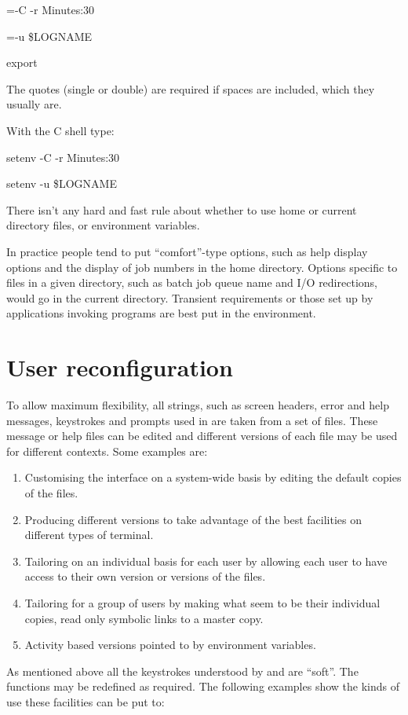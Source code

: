 \begin{expara}

\BtrVarname={\textquotesingle}-C -r Minutes:30{\textquotesingle}

\BtqVarname={\textquotedbl}-u \$LOGNAME{\textquotedbl}

export \BtrVarname{} \BtqVarname{}

\end{expara}

The quotes (single or double) are required if spaces are included, which they usually are.

With the C shell type:

\begin{expara}

setenv \BtrVarname{} {\textquotesingle}-C -r Minutes:30{\textquotesingle}

setenv \BtqVarname{} {\textquotesingle}-u \$LOGNAME{\textquotesingle}

\end{expara}

There isn't any hard and fast rule about whether to use home \homeconfigpath{} or current directory \configurationfile{} files, or
environment variables.

In practice people tend to put ``comfort''-type options, such as help display options and the display of job numbers in the home directory.
Options specific to files in a given directory, such as batch job queue name and I/O redirections, would go in the current directory. Transient
requirements or those set up by applications invoking \ProductName{} programs are best put in the environment.

\section{User reconfiguration}
To allow maximum flexibility, all strings, such as screen headers, error and help messages, keystrokes and prompts used in \ProductName{} are taken
from a set of files. These message or help files can be edited and different versions of each file may be used for different contexts.
Some examples are:

\begin{enumerate}
\item Customising the interface on a system-wide basis by editing the default copies of the files.
\item Producing different versions to take advantage of the best facilities on different types of terminal.
\item Tailoring on an individual basis for each user by allowing each user to have access to their own version or versions of the files.
\item Tailoring for a group of users by making what seem to be their individual copies, read only symbolic links to a master copy.
\item Activity based versions pointed to by environment variables.
\end{enumerate}
As mentioned above all the keystrokes understood by \BtqName{} and \BtuserName{} are ``soft''. The functions may be redefined as
required. The following examples show the kinds of use these facilities can be put to:

